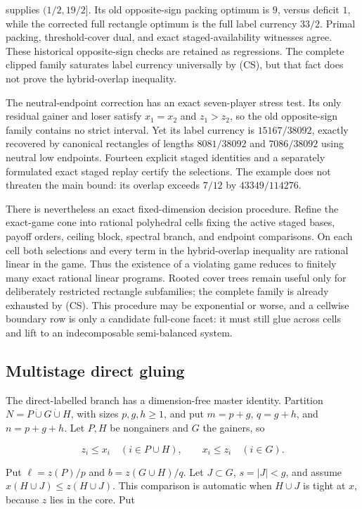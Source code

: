 \documentclass[11pt]{article}
\begin{document}
supplies $(1/2,19/2]$.  Its old opposite-sign packing optimum is $9$, versus
deficit $1$, while the corrected full rectangle optimum is the full label
currency $33/2$.  Primal packing, threshold-cover dual, and exact
staged-availability witnesses agree.  These
historical opposite-sign checks are retained as regressions.  The complete
clipped family saturates label currency universally by (CS), but that fact
does not prove the hybrid-overlap inequality.

The neutral-endpoint correction has an exact seven-player stress test.  Its
only residual gainer and loser satisfy $x_1=x_2$ and $z_1>z_2$, so the old
opposite-sign family contains no strict interval.  Yet its label currency is
$15167/38092$, exactly recovered by canonical rectangles of lengths
$8081/38092$ and $7086/38092$ using neutral low endpoints.  Fourteen explicit
staged identities and a separately formulated exact staged replay certify
the selections.  The example does not threaten the main bound: its overlap
exceeds $7/12$ by $43349/114276$.

There is nevertheless an exact fixed-dimension decision procedure.  Refine
the exact-game cone into rational polyhedral cells fixing the active staged
bases, payoff orders, ceiling block, spectral branch, and endpoint comparisons.
On each cell both selections and every term in the hybrid-overlap inequality
are rational linear in the game.  Thus the existence of a violating game
reduces to finitely many exact rational linear programs.  Rooted cover trees
remain useful only for deliberately restricted rectangle subfamilies; the
complete family is already exhausted by (CS).  This procedure may be
exponential or worse, and a cellwise boundary row is only a candidate
full-cone facet: it must still glue across cells and lift to an indecomposable
semi-balanced system.

\subsection{Multistage direct gluing}

The direct-labelled branch has a dimension-free master identity.  Partition
$N=P\mathbin{\dot\cup}G\mathbin{\dot\cup}H$, with sizes $p,g,h\ge1$, and put
$m=p+g$, $q=g+h$, and $n=p+g+h$.  Let $P,H$ be nongainers and $G$ the
gainers, so

\[
 z_i\le x_i\quad(i\in P\cup H),\qquad x_i\le z_i\quad(i\in G).
\]

Put $\ell=z(P)/p$ and $b=z(G\cup H)/q$.  Let $J\subset G$, $s=|J|<g$, and assume
$x(H\cup J)\le z(H\cup J)$.  This comparison is automatic when $H\cup J$
is tight at $x$, because $z$ lies in the core.  Put
\end{document}
